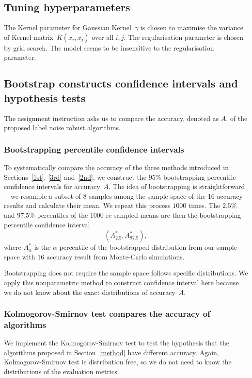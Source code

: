 \documentclass[12pt]{article} %
\begin{document}
\subsection{Tuning hyperparameters}
The Kernel parameter for Gaussian Kernel~$\gamma$ is chosen to maximise the variance of Kernel matrix~$K(x_i,x_j)$ over all $i,j$. The regularisation parameter is chosen by grid search. The model seems to be insensitive to the regularisation parameter.

\subsection{Bootstrap constructs confidence intervals and hypothesis tests}\label{ci}
The assignment instruction asks us to compare the accuracy, denoted as $A$, of the proposed label noise robust algorithms. 
\subsubsection{Bootstrapping percentile confidence intervals}\label{ci}
To systematically compare the accuracy of the three methods introduced in Sections~\ref{1st}, \ref{3rd} and~\ref{2nd}, we construct the $95\%$ bootstrapping percentile confidence intervals for accuracy~$A$. The idea of bootstrapping  is straightforward---we resample a subset of $8$ samples among the sample space of the $16$ accuracy results and calculate their mean. We repeat this process $1000$ times. The $2.5\%$ and $97.5\%$ percentiles of the $1000$ re-sampled means are then the bootstrapping percentile confidence interval
\begin{equation}
({A}^*_{2.5}, {A}^*_{97.5}), \label{eq:boot}
\end{equation}
where $A^*_{\alpha}$ is the $\alpha$ percentile of the bootstrapped distribution from our sample space with $16$ accuracy result from Monte-Carlo simulations.

Bootstrapping does not require the sample space follows specific distributions. We apply this nonparametric method to construct confidence interval here because we do not know about the exact distributions of accuracy~$A$.

\subsubsection{Kolmogorov-Smirnov test compares the accuracy of algorithms}
We implement the Kolmogorov-Smirnov test to test the hypothesis that the algorithms proposed in Section~\ref{method} have different accuracy.  Again, Kolmogorov-Smirnov test is distribution free, so we do not need to know the distributions of the evaluation metrics.
\end{document}
